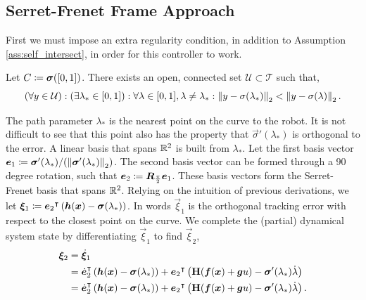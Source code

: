 \subsection{Serret-Frenet Frame Approach}
First we must impose an extra regularity condition, in addition to Assumption \ref{ass:self_intersect}, in order for this controller to work.
\begin{assumption}
    Let $C\coloneqq\bm{\sigma}([0,1])$. There exists an open, connected set $\mathcal{U}\subset\mathcal{T}$ such that,
    \begin{equation*}
        (\forall y\in\mathcal{U}) : (\exists \lambda_* \in [0,1]) : \forall \lambda\in[0,1], \lambda\neq\lambda_* : \mathop{}\!\left\|y - \sigma(\lambda_*)\right\|_2 < \mathop{}\!\left\|y - \sigma(\lambda)\right\|_2.
    \end{equation*}
    \label{ass:unique_operating}
\end{assumption}
The path parameter $\lambda_*$ is the nearest point on the curve to the robot. It is not difficult to see that this point also has the property that $\vec{\sigma}'(\lambda_*)$ is orthogonal to the error. A linear basis that spans $\mathbb{R}^2$ is built from $\lambda_*$. Let the first basis vector $\bm{e}_1 \coloneqq \bm{\sigma}'(\lambda_*)/(\mathop{}\!\left\|\bm{\sigma}'(\lambda_*)\right\|_2)$. The second basis vector can be formed through a 90 degree rotation, such that $\bm{e}_2 \coloneqq \bm{R}_{\frac{\pi}{2}}\bm{e}_1$. These basis vectors form the Serret-Frenet basis that spans $\mathbb{R}^2$. Relying on the intuition of previous derivations, we let $\bm{\xi}_1 \coloneqq {\bm{e}_2}^{\intercal}\left(\bm{h}(\bm{x}) - \bm{\sigma}(\lambda_*)\right)$. In words $\vec{\xi}_1$ is the orthogonal tracking error with respect to the closest point on the curve. We complete the (partial) dynamical system state by differentiating $\vec{\xi}_1$ to find $\vec{\xi}_2$,
\begin{align*}
    \bm{\xi}_2     &=  \dot{\bm{\xi}}_1\\
                    &=  {\dot{\bm{e}}_2}^{\intercal}\left(\bm{h}(\bm{x}) - \bm{\sigma}(\lambda_*)\right)
                        +
                        {\bm{e}_2}^{\intercal}\left(\mathbf{H}(\bm{f}(\bm{x}) + \bm{g}u) - \bm{\sigma}'(\lambda_*)\dot{\lambda} \right)\\
                    &=  {\dot{\bm{e}}_2}^{\intercal}\left(\bm{h}(\bm{x}) - \bm{\sigma}(\lambda_*)\right)
                        +
                        {\bm{e}_2}^{\intercal}\left(\mathbf{H}(\bm{f}(\bm{x}) + \bm{g}u) - \bm{\sigma}'(\lambda_*)\dot{\lambda} \right).
\end{align*}
